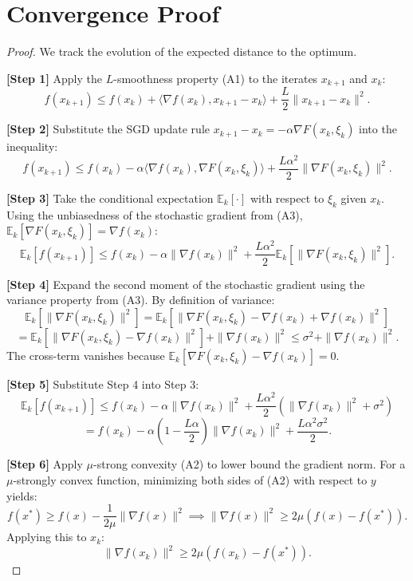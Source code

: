 \documentclass[11pt]{article}
\begin{document}
\section{Convergence Proof}

\begin{proof}
We track the evolution of the expected distance to the optimum.

\textbf{[Step 1]} Apply the $L$-smoothness property (A1) to the iterates $x_{k+1}$ and $x_k$:
\[ f(x_{k+1}) \le f(x_k) + \langle \nabla f(x_k), x_{k+1} - x_k \rangle + \frac{L}{2} \|x_{k+1} - x_k\|^2. \]

\textbf{[Step 2]} Substitute the SGD update rule $x_{k+1} - x_k = -\alpha \nabla F(x_k, \xi_k)$ into the inequality:
\[ f(x_{k+1}) \le f(x_k) - \alpha \langle \nabla f(x_k), \nabla F(x_k, \xi_k) \rangle + \frac{L \alpha^2}{2} \|\nabla F(x_k, \xi_k)\|^2. \]

\textbf{[Step 3]} Take the conditional expectation $\mathbb{E}_k[\cdot]$ with respect to $\xi_k$ given $x_k$. Using the unbiasedness of the stochastic gradient from (A3), $\mathbb{E}_k[\nabla F(x_k, \xi_k)] = \nabla f(x_k)$:
\[ \mathbb{E}_k[f(x_{k+1})] \le f(x_k) - \alpha \|\nabla f(x_k)\|^2 + \frac{L \alpha^2}{2} \mathbb{E}_k[\|\nabla F(x_k, \xi_k)\|^2]. \]

\textbf{[Step 4]} Expand the second moment of the stochastic gradient using the variance property from (A3). By definition of variance:
\[ \mathbb{E}_k[\|\nabla F(x_k, \xi_k)\|^2] = \mathbb{E}_k[\|\nabla F(x_k, \xi_k) - \nabla f(x_k) + \nabla f(x_k)\|^2] \]
\[ = \mathbb{E}_k[\|\nabla F(x_k, \xi_k) - \nabla f(x_k)\|^2] + \|\nabla f(x_k)\|^2 \le \sigma^2 + \|\nabla f(x_k)\|^2. \]
The cross-term vanishes because $\mathbb{E}_k[\nabla F(x_k, \xi_k) - \nabla f(x_k)] = 0$.

\textbf{[Step 5]} Substitute Step 4 into Step 3:
\[ \mathbb{E}_k[f(x_{k+1})] \le f(x_k) - \alpha \|\nabla f(x_k)\|^2 + \frac{L \alpha^2}{2} (\|\nabla f(x_k)\|^2 + \sigma^2) \]
\[ = f(x_k) - \alpha \left( 1 - \frac{L \alpha}{2} \right) \|\nabla f(x_k)\|^2 + \frac{L \alpha^2 \sigma^2}{2}. \]

\textbf{[Step 6]} Apply $\mu$-strong convexity (A2) to lower bound the gradient norm. For a $\mu$-strongly convex function, minimizing both sides of (A2) with respect to $y$ yields:
\[ f(x^*) \ge f(x) - \frac{1}{2\mu} \|\nabla f(x)\|^2 \implies \|\nabla f(x)\|^2 \ge 2\mu (f(x) - f(x^*)). \]
Applying this to $x_k$:
\[ \|\nabla f(x_k)\|^2 \ge 2\mu (f(x_k) - f(x^*)). \]


\end{proof}
\end{document}
